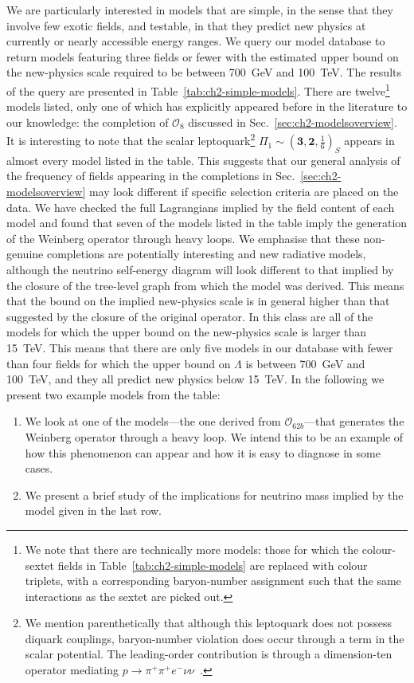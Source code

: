 We are particularly interested in models that are simple, in the sense that they
involve few exotic fields, and testable, in that they predict new physics at
currently or nearly accessible energy ranges. We query our model database to
return models featuring three fields or fewer with the estimated upper bound on
the new-physics scale required to be between \SI{700}{\GeV} and \SI{100}{\TeV}.
The results of the query are presented in Table~\ref{tab:ch2-simple-models}. There
are twelve\footnote{We note that there are technically more models: those for
  which the colour-sextet fields in Table~\ref{tab:ch2-simple-models} are replaced
  with colour triplets, with a corresponding baryon-number assignment such that
  the same interactions as the sextet are picked out.} models listed, only one
of which has explicitly appeared before in the literature to our knowledge: the
completion of $\mathcal{O}_{8}$ discussed in Sec.~\ref{sec:ch2-modelsoverview}. It
is interesting to note that the scalar leptoquark\footnote{We mention
  parenthetically that although this leptoquark does not possess diquark
  couplings, baryon-number violation does occur through a term in the scalar
  potential. The leading-order contribution is through a dimension-ten operator
  mediating $p \to \pi^{+}\pi^{+} e^{-} \nu \nu$~\cite{Arnold:2012sd}.}
$\Pi_{1} \sim (\mathbf{3}, \mathbf{2}, \tfrac{1}{6})_{S}$ appears in almost
every model listed in the table. This suggests that our general analysis of the
frequency of fields appearing in the completions in
Sec.~\ref{sec:ch2-modelsoverview} may look different if specific selection criteria
are placed on the data. We have checked the full Lagrangians implied by the
field content of each model and found that seven of the models listed in the
table imply the generation of the Weinberg operator through heavy loops. We
emphasise that these non-genuine completions are potentially interesting and new
radiative models, although the neutrino self-energy diagram will look different
to that implied by the closure of the tree-level graph from which the model was
derived. This means that the bound on the implied new-physics scale is in
general higher than that suggested by the closure of the original operator. In
this class are all of the models for which the upper bound on the new-physics
scale is larger than \SI{15}{\TeV}. This means that there are only five models
in our database with fewer than four fields for which the upper bound on
$\Lambda$ is between \SI{700}{\GeV} and \SI{100}{\TeV}, and they all predict new
physics below \SI{15}{\TeV}. In the following we present two example models from
the table:
\begin{enumerate}
  \item We look at one of the models---the one derived from
    $\mathcal{O}_{62b}$---that generates the Weinberg operator through a heavy
    loop. We intend this to be an example of how this phenomenon can appear and
    how it is easy to diagnose in some cases.
  \item We present a brief study of the implications for neutrino mass implied
    by the model given in the last row.
\end{enumerate}

